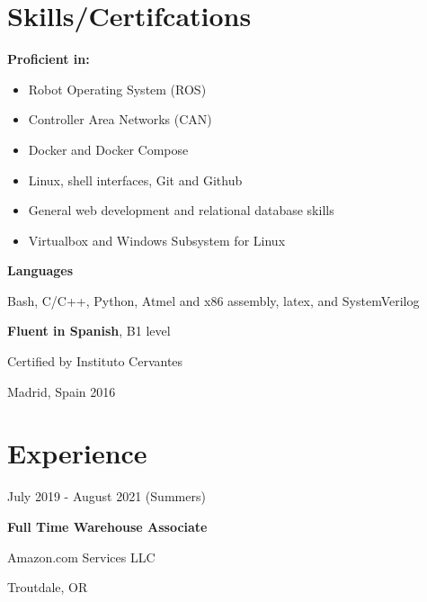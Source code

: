 \documentclass[12pt,letterpaper]{article}
\begin{document}
\begin{minipage}[t]{0.45\linewidth}


	\raggedright

		\vspace{0.5cm}
    \section*{Skills/Certifcations}

	\textbf{Proficient in:} 
	\begin{itemize}
		\item Robot Operating System (ROS)
		\item Controller Area Networks (CAN)
		\item Docker and Docker Compose
		\item Linux, shell interfaces, Git and Github
		\item General web development and relational database skills
		\item Virtualbox and Windows Subsystem for Linux
	\end{itemize}
	\vspace{0.5cm}
	
	\textbf{Languages}

	Bash, C/C++, Python, Atmel and x86 assembly, latex, and SystemVerilog
	\vspace{0.5cm}

	\textbf{Fluent in Spanish}, B1 level

	Certified by Instituto Cervantes

	Madrid, Spain 2016

    
	\section*{Experience}
	July 2019 - August 2021 (Summers)
	
	\textbf{Full Time Warehouse Associate}
	
	Amazon.com Services LLC

	Troutdale, OR
	
	\end{minipage}
\end{document}
